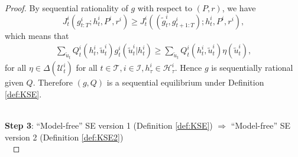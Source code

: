 \documentclass[pdflatex,sn-basic]{sn-jnl}
\newcommand{\Qfunc}{Q}
\theoremstyle{thmstyleone}%
\theoremstyle{thmstyletwo}%
\theoremstyle{thmstylethree}%
\begin{document}
\begin{appendices}
\begin{proof}
		By sequential rationality of $g$ with respect to $(P, r)$, we have $$J_t^i(g_{t:T}^i; h_t^i, P^i, r^i) \geq J_t^i((\tilde{g}_{t}^i, g_{t+1:T}^i); h_t^i, P^i, r^i),$$which means that
		\begin{align}
			\sum_{\tilde{u}_t}\Qfunc_{t}^{i}(h_t^i, \tilde{u}_t^i) g_t^i(\tilde{u}_t^i|h_t^i) \geq \sum_{\tilde{u}_t}\Qfunc_{t}^{i}(h_t^i, \tilde{u}_t^i) \eta(\tilde{u}_t^i),
		\end{align}
		for all $\eta\in\Delta(\mathcal{U}_t^i)$ for all $t\in \mathcal{T}, i\in\mathcal{I}, h_\tau^i \in\mathcal{H}_\tau^i$. Hence $g$ is sequentially rational given $\Qfunc$. Therefore $(g, \Qfunc)$ is a sequential equilibrium under Definition \ref{def:KSE}.\\~
		
		\textbf{Step 3}: ``Model-free'' SE version 1 (Definition \ref{def:KSE}) $\Rightarrow$ ``Model-free'' SE version 2 (Definition \ref{def:KSE2})\\~
		

\end{proof}
\end{appendices}
\end{document}
